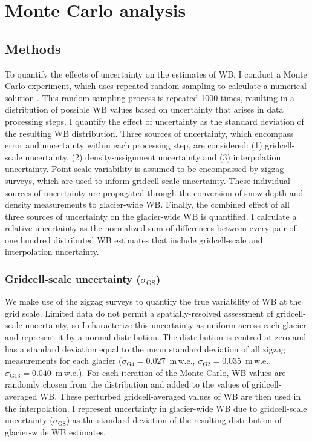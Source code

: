 \documentclass{sfuthesis}
\begin{document}
{%


\section{Monte Carlo analysis}
\label{sec:Unc_methods}

\subsection{Methods}
To quantify the effects of uncertainty on the estimates of WB, I conduct a Monte Carlo experiment, which uses repeated random sampling to calculate a numerical solution \citep{Metropolis1949}. This random sampling process is repeated 1000 times, resulting in a distribution of possible WB values based on uncertainty that arises in data processing steps. I quantify the effect of uncertainty as the standard deviation of the resulting WB distribution. Three sources of uncertainty, which encompass error and uncertainty within each processing step, are considered: (1) gridcell-scale uncertainty, (2) density-assignment uncertainty and (3) interpolation uncertainty. Point-scale variability is assumed to be encompassed by zigzag surveys, which are used to inform gridcell-scale uncertainty. These individual sources of uncertainty are propagated through the conversion of snow depth and density measurements to glacier-wide WB. Finally, the combined effect of all three sources of uncertainty on the glacier-wide WB is quantified. I calculate a relative uncertainty as the normalized sum of differences between every pair of one hundred distributed WB estimates that include gridcell-scale and interpolation uncertainty.

\subsubsection{Gridcell-scale uncertainty ($\sigma_{\mathrm{GS}}$)}
We make use of the zigzag surveys to quantify the true variability of WB at the grid scale. Limited data do not permit a spatially-resolved assessment of gridcell-scale uncertainty, so I characterize this uncertainty as uniform across each glacier and represent it by a normal distribution. The distribution is centred at zero and has a standard deviation equal to the mean standard deviation of all zigzag measurements for each glacier ($\sigma_{\mathrm{G4}} = 0.027 $ \,m\,w.e., $\sigma_{\mathrm{G2}} = 0.035$ \,m\,w.e., $\sigma_{\mathrm{G13}} = 0.040 $ \,m\,w.e.). For each iteration of the Monte Carlo, WB values are randomly chosen from the distribution and added to the values of gridcell-averaged WB. These perturbed gridcell-averaged values of WB are then used in the interpolation. I represent uncertainty in glacier-wide WB due to gridcell-scale uncertainty ($\sigma_{\mathrm{GS}}$) as the standard deviation of the resulting distribution of glacier-wide WB estimates.  

}
\end{document}
